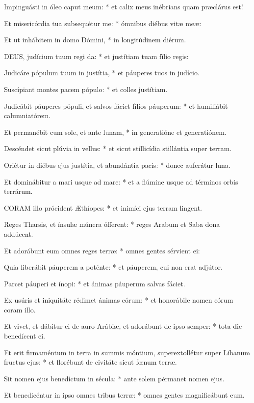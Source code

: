 Impinguásti in óleo caput meum: * et calix meus inébrians quam præclárus est!

Et misericórdia tua subsequétur me: * ómnibus diébus vitæ meæ:

Et ut inhábitem in domo Dómini, * in longitúdinem diérum.


\lettrine[lines=2]{D}{EUS}, judícium tuum regi da: * et justítiam tuam fílio regis:

Judicáre pópulum tuum in justítia, * et páuperes tuos in judício.

Suscípiant montes pacem pópulo: * et colles justítiam.

Judicábit páuperes pópuli, et salvos fáciet fílios páuperum: * et humiliábit calumniatórem.

Et permanébit cum sole, et ante lunam, * in generatióne et generatiónem.

Descéndet sicut plúvia in vellus: * et sicut stillicídia stillántia super terram.

Oriétur in diébus ejus justítia, et abundántia pacis: * donec auferátur luna.

Et dominábitur a mari usque ad mare: * et a flúmine usque ad términos orbis terrárum.


\lettrine[lines=2]{C}{ORAM} illo prócident Æthíopes: * et inimíci ejus terram lingent.

Reges Tharsis, et ínsulæ múnera ófferent: * reges Arabum et Saba dona addúcent.

Et adorábunt eum omnes reges terræ: * omnes gentes sérvient ei:

Quia liberábit páuperem a poténte: * et páuperem, cui non erat adjútor.

Parcet páuperi et ínopi: * et ánimas páuperum salvas fáciet.

Ex usúris et iniquitáte rédimet ánimas eórum: * et honorábile nomen eórum coram illo.

Et vivet, et dábitur ei de auro Arábiæ, et adorábunt de ipso semper: * tota die benedícent ei.

Et erit firmaméntum in terra in summis móntium, superextollétur super Líbanum fructus ejus: * et florébunt de civitáte sicut fœnum terræ.

Sit nomen ejus benedíctum in sécula: * ante solem pérmanet nomen ejus.

Et benedicéntur in ipso omnes tribus terræ: * omnes gentes magnificábunt eum.

